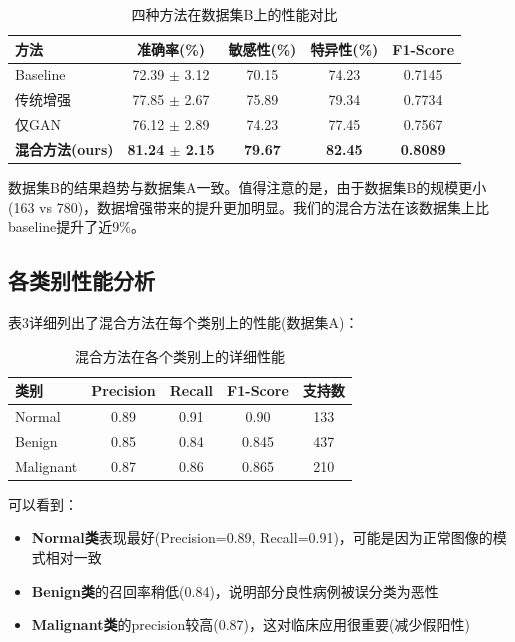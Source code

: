 \documentclass[supercite]{../Hust-undergraduate-translation/Experimental_Report}
\theoremstyle{definition}
\begin{document}
\begin{table}[htbp]
\centering
\caption{四种方法在数据集B上的性能对比}
\label{tbl:result_dataset_b}
\begin{tabular}{|l|c|c|c|c|}
\hline
方法 & 准确率(\%) & 敏感性(\%) & 特异性(\%) & F1-Score \\
\hline
Baseline & 72.39 $\pm$ 3.12 & 70.15 & 74.23 & 0.7145 \\
\hline
传统增强 & 77.85 $\pm$ 2.67 & 75.89 & 79.34 & 0.7734 \\
\hline
仅GAN & 76.12 $\pm$ 2.89 & 74.23 & 77.45 & 0.7567 \\
\hline
\textbf{混合方法(ours)} & \textbf{81.24 $\pm$ 2.15} & \textbf{79.67} & \textbf{82.45} & \textbf{0.8089} \\
\hline
\end{tabular}
\end{table}

数据集B的结果趋势与数据集A一致。值得注意的是，由于数据集B的规模更小(163 vs 780)，数据增强带来的提升更加明显。我们的混合方法在该数据集上比baseline提升了近9\%。

\subsection{各类别性能分析}

表3详细列出了混合方法在每个类别上的性能(数据集A)：

\begin{table}[htbp]
\centering
\caption{混合方法在各个类别上的详细性能}
\label{tbl:class_performance}
\begin{tabular}{|l|c|c|c|c|}
\hline
类别 & Precision & Recall & F1-Score & 支持数 \\
\hline
Normal & 0.89 & 0.91 & 0.90 & 133 \\
\hline
Benign & 0.85 & 0.84 & 0.845 & 437 \\
\hline
Malignant & 0.87 & 0.86 & 0.865 & 210 \\
\hline
\end{tabular}
\end{table}

可以看到：
\begin{itemize}
\item \textbf{Normal类}表现最好(Precision=0.89, Recall=0.91)，可能是因为正常图像的模式相对一致
\item \textbf{Benign类}的召回率稍低(0.84)，说明部分良性病例被误分类为恶性
\item \textbf{Malignant类}的precision较高(0.87)，这对临床应用很重要(减少假阳性)
\end{itemize}
\end{document}
